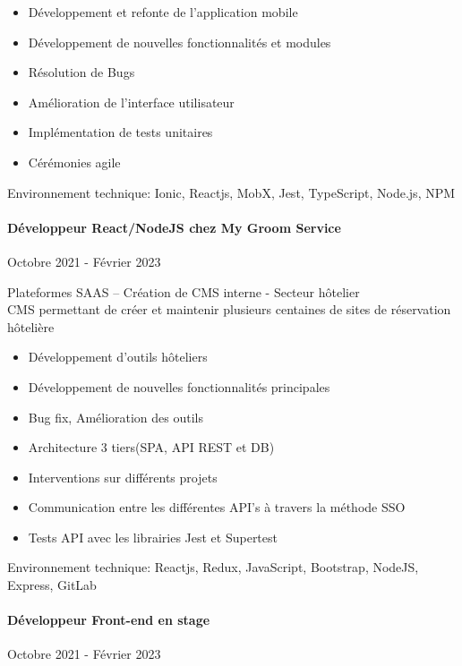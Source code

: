 \documentclass{article}
\begin{document}
\raggedright  
\begin{itemize}
  \item{Développement et refonte de l’application mobile}
  \item{Développement de nouvelles fonctionnalités et modules}
  \item{Résolution de Bugs}
  \item{Amélioration de l’interface utilisateur}
  \item{Implémentation de tests unitaires}
  \item{Cérémonies agile}
\end{itemize}
\noindent
Environnement technique: Ionic, Reactjs, MobX, Jest, TypeScript, Node.js, NPM
\paragraph{Développeur React/NodeJS chez My Groom Service}\hspace*{\fill}Octobre 2021 - Février 2023

\noindent
Plateformes SAAS – Création de CMS interne - Secteur hôtelier \\
CMS permettant de créer et maintenir plusieurs centaines de sites de réservation hôtelière

\raggedright
\begin{itemize}
  \item{Développement d’outils hôteliers}
  \item{Développement de nouvelles fonctionnalités principales}
  \item{Bug fix, Amélioration des outils}
  \item{Architecture 3 tiers(SPA, API REST et DB)}
  \item{Interventions sur différents projets}
  \item{Communication entre les différentes API’s à travers la méthode SSO}
  \item{Tests API avec les librairies Jest et Supertest}
\end{itemize}
\noindent
Environnement technique: Reactjs, Redux, JavaScript, Bootstrap, NodeJS, Express, GitLab
\paragraph{Développeur Front-end en stage}\hspace*{\fill}Octobre 2021 - Février 2023
\end{document}
